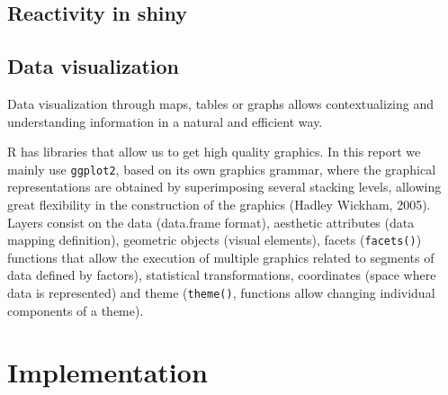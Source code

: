\documentclass[11pt,a4paper]{report}
\begin{document}
\subsection{Reactivity in shiny}







\subsection{Data visualization}
Data visualization through maps, tables or graphs allows contextualizing and understanding information in a natural and efficient way.


R has libraries that allow us to get high quality graphics. In this report we mainly use \verb!ggplot2!, based on its own graphics grammar,  where the graphical representations are obtained by superimposing several stacking levels, allowing great flexibility in the construction of the graphics (Hadley Wickham, 2005).  \cite{ggplot2}
\\
Layers consist on the data (data.frame format), aesthetic attributes (data mapping definition), geometric objects (visual elements), facets (\verb!facets()!) functions that allow the execution of multiple graphics related to segments of data defined by factors), statistical transformations, coordinates (space where data is represented) and theme (\verb!theme()!, functions allow changing individual components of a theme).

\section{Implementation}
\end{document}
